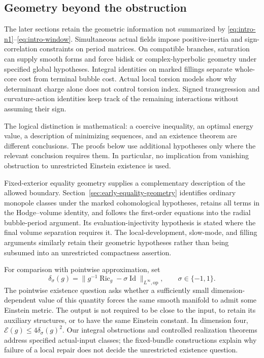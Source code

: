 \documentclass[10pt,a4paper]{article}
\theoremstyle{definition}
\theoremstyle{remark}
\numberwithin{equation}{section}
\providecommand{\Ric}{\operatorname{Ric}}
\providecommand{\E}{\mathcal E}
\providecommand{\Id}{\operatorname{Id}}
\begin{document}
\subsection{Geometry beyond the obstruction}
The later sections retain the geometric information not summarized by
\eqref{eq:intro-n1}--\eqref{eq:intro-window}. Simultaneous actual
fields impose positive-inertia and sign-correlation constraints on
period matrices. On compatible branches, saturation can supply smooth
forms and force bidisk or complex-hyperbolic geometry under specified
global hypotheses. Integral identities on marked fillings separate
whole-core cost from terminal bubble cost. Actual local torsion models
show why determinant charge alone does not control torsion index.
Signed transgression and curvature-action identities keep track of the
remaining interactions without assuming their sign.

The logical distinction is mathematical: a coercive inequality, an
optimal energy value, a description of minimizing sequences, and an
existence theorem are different conclusions. The proofs below use
additional hypotheses only where the relevant conclusion requires them.
In particular, no implication from vanishing obstruction to unrestricted
Einstein existence is used.

Fixed-exterior equality geometry supplies a complementary description
of the allowed boundary. Section~\ref{sec:early-equality-geometry}
identifies ordinary monopole classes under the marked cohomological
hypotheses, retains all terms in the Hodge--volume identity, and follows
the first-order equations into the radial bubble-period argument.
Its evaluation-injectivity hypothesis is stated where the final volume
separation requires it. The local-development, slow-mode, and filling
arguments similarly retain their geometric hypotheses rather than
being subsumed into an unrestricted compactness assertion.

For comparison with pointwise approximation, set
\[
 \delta_\sigma(g)=\|g^{-1}\Ric_g-\sigma\Id\|_{L^\infty,\mathrm{op}},
 \qquad \sigma\in\{-1,1\}.
\]
The pointwise existence question asks whether a sufficiently small
dimension-dependent value of this quantity forces the same smooth
manifold to admit some Einstein metric. The output is not required to
be close to the input, to retain its auxiliary structures, or to have
the same Einstein constant. In dimension four, $\E(g)\le4\delta_\sigma(g)^2$.
Our integral obstructions and controlled realization theorems address
specified actual-input classes; the fixed-bundle constructions explain
why failure of a local repair does not decide the unrestricted existence
question.
\end{document}
